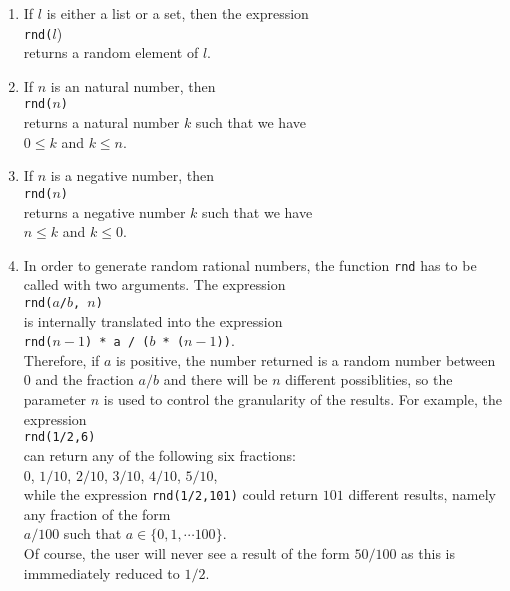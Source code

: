 \begin{enumerate}
\item If $l$ is either a list or a set, then the expression
      \\[0.2cm]
      \hspace*{1.3cm}
      \texttt{rnd($l$})
      \\[0.2cm]
      returns a random element of $l$.
\item If $n$ is an natural number, then 
      \\[0.2cm]
      \hspace*{1.3cm}
      \texttt{rnd($n$)}
      \\[0.2cm]
      returns a natural number $k$ such that we have
      \\[0.2cm]
      \hspace*{1.3cm}
      $0 \leq k$ and $k \leq n$.
\item If $n$ is a negative number, then 
      \\[0.2cm]
      \hspace*{1.3cm}
      \texttt{rnd($n$)}
      \\[0.2cm]
      returns a negative number $k$ such that we have
      \\[0.2cm]
      \hspace*{1.3cm}
      $n \leq k$ \quad and \quad $k \leq 0$.
\item In order to generate random rational numbers, the function \texttt{rnd} has to be called with
      two arguments.  The expression
      \\[0.2cm]
      \hspace*{1.3cm}
      \texttt{rnd($a$/$b$, $n$)}
      \\[0.2cm]
      is internally translated into the expression
      \\[0.2cm]
      \hspace*{1.3cm}
      \texttt{rnd($n-1$) * a / ($b$ * ($n-1$))}.
      \\[0.2cm]
      Therefore, if $a$ is positive, the number returned is a random number between $0$ and the
      fraction $a/b$ and there will be $n$ different possiblities, so the parameter $n$ is used to
      control the granularity of the results.  For example,  the expression 
      \\[0.2cm]
      \hspace*{1.3cm}
      \texttt{rnd(1/2,6)}
      \\[0.2cm]
      can return any of the following six fractions:
      \\[0.2cm]
      \hspace*{1.3cm}
      $0$, $1/10$, $2/10$, $3/10$, $4/10$, $5/10$,
      \\[0.2cm]
      while the expression \texttt{rnd(1/2,101)} could return $101$ different results, namely any
      fraction of the form
      \\[0.2cm]
      \hspace*{1.3cm}
      $a/100$ \quad such that $a \in \{0, 1, \cdots 100\}$.
      \\[0.2cm]
      Of course, the user will never see a result of the form $50/100$ as this is immmediately
      reduced to $1/2$. 


\end{enumerate}
